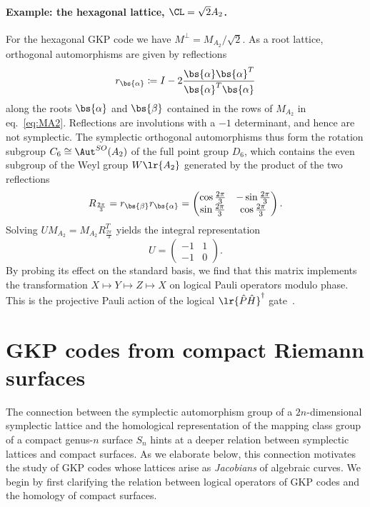 \documentclass[a4paper, aps, pra, 11pt, onecolumn, tightenlines, superscriptaddress]{revtex4-2}
\begin{document}
\paragraph*{Example: the hexagonal lattice, $\CL=\sqrt{2}A_2$.}
For the hexagonal GKP code we have $M^{\perp}=M_{A_2}/\sqrt{2}$. 
As a root lattice, orthogonal automorphisms are given by reflections 
\begin{equation}
\label{eq:reflection}
    r_{\bs{\alpha}}\coloneqq I-2\frac{\bs{\alpha}\bs{\alpha}^T}{\bs{\alpha}^T\bs{\alpha}}
\end{equation}
along the roots $\bs{\alpha}$ and $\bs{\beta}$ contained in the rows of $M_{A_2}$ in eq.~\eqref{eq:MA2}.
Reflections are involutions with a $-1$ determinant, and hence are not symplectic. 
The symplectic orthogonal automorphisms thus form the rotation subgroup $C_6\cong\Aut^{SO}(A_2)$ of the full point group $D_6$, which contains the even subgroup of the Weyl group $W\lr{A_2}$ generated by the product of the two reflections
\begin{equation}
    R_{\frac{2\pi}{3}}=r_{\bs{\beta}}r_{\bs{\alpha}}=
    \begin{pmatrix}
        \cos \frac{2\pi}{3} & -\sin \frac{2\pi}{3} \\ 
        \sin \frac{2\pi}{3}& \cos \frac{2\pi}{3}
    \end{pmatrix}.
\end{equation}
Solving $UM_{A_2}=M_{A_2}R_{\frac{2\pi}{3}}^T$ yields the integral representation
\begin{equation}
U=\begin{pmatrix}
-1 & 1 \\ -1 & 0
\end{pmatrix}.\label{eq:Umat}
\end{equation}
By probing its effect on the standard basis, we find that this matrix implements the transformation $X\mapsto Y\mapsto Z\mapsto X$ on logical Pauli operators modulo phase. This is the projective Pauli action of the logical $\lr{\hat P\hat H}^{\dagger}$ gate~\cite{GCB}.


\section{GKP codes from compact Riemann surfaces}\label{sec:curves}

The connection between the symplectic automorphism group of a $2n$-dimensional symplectic lattice and the homological representation of the mapping class group of a compact genus-$n$ surface $S_n$ hints at a deeper relation between symplectic lattices and compact surfaces.
As we elaborate below, this connection motivates the study of GKP codes whose lattices arise as \emph{Jacobians} of algebraic curves. 
We begin by first clarifying the relation between logical operators of GKP codes and the homology of compact surfaces. 
\end{document}
